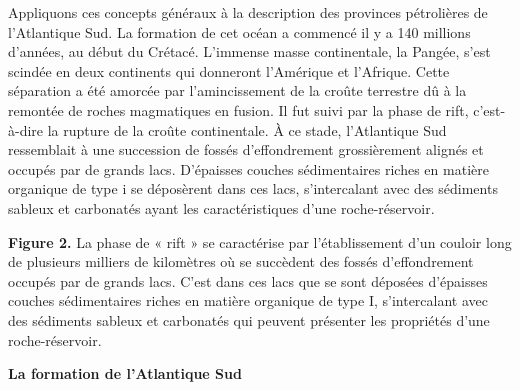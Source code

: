 \documentclass[8pt]{article}
\begin{document}
Appliquons ces concepts généraux à la description des provinces pétrolières de l'Atlantique Sud. La formation de cet océan a commencé il y a 140 millions d'années, au début du Crétacé. L'immense masse continentale, la Pangée, s'est scindée en deux continents qui donneront l'Amérique et l'Afrique. Cette séparation a été amorcée par l'amincissement de la croûte terrestre dû à la remontée de roches magmatiques en fusion. Il fut suivi par la phase de rift, c'est-à-dire la rupture de la croûte continentale. À ce stade, l'Atlantique Sud ressemblait à une succession de fossés d'effondrement grossièrement alignés et occupés par de grands lacs. D'épaisses couches sédimentaires riches en matière organique de type i se déposèrent dans ces lacs, s'intercalant avec des sédiments sableux et carbonatés ayant les caractéristiques d'une roche-réservoir.\\

\begin{tcolorbox}[colback=white]
	\begin{center}
	\end{center}
	\textbf{Figure 2.} La phase de « rift » se caractérise par l’établissement d’un
	couloir long de plusieurs milliers de kilomètres où se succèdent des
	fossés d’effondrement occupés par de grands lacs. C’est dans ces lacs
	que se sont déposées d’épaisses couches sédimentaires riches en matière
	organique de type I, s’intercalant avec des sédiments sableux et carbonatés qui peuvent présenter les propriétés d’une roche-réservoir.
	
\end{tcolorbox}

\textbf{La formation de l'Atlantique Sud}\\
\end{document}
